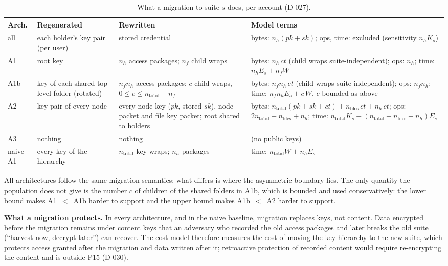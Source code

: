 \documentclass[11pt,a4paper]{article}
\begin{document}
\begin{table}[H]
\centering\small
\caption{What a migration to suite $s$ does, per account (D-027).}\label{tab:accounting}
\begin{tabularx}{\textwidth}{l >{\raggedright\arraybackslash}X >{\raggedright\arraybackslash}X >{\raggedright\arraybackslash}X}
\toprule
\textbf{Arch.} & \textbf{Regenerated} & \textbf{Rewritten} & \textbf{Model terms}\\
\midrule
all & each holder's key pair (per user) & stored credential & bytes: $n_h(pk+sk)$; ops, time: excluded (sensitivity $n_h K_s$)\\
A1 & root key & $n_h$ access packages; $n_f$ child wraps & bytes: $n_h\,ct$ (child wraps suite-independent); ops: $n_h$; time: $n_h E_s + n_f W$\\
A1b & key of each shared top-level folder (rotated) & $n_f n_h$ access packages; $c$ child wraps, $0 \le c \le n_{\mathrm{total}} - n_f$ & bytes: $n_f n_h\,ct$ (child wraps suite-independent); ops: $n_f n_h$; time: $n_f n_h E_s + c\,W$, $c$ bounded as above\\
A2 & key pair of every node & every node key ($pk$, stored $sk$), node packet and file key packet; root shared to holders & bytes: $n_{\mathrm{total}}(pk+sk+ct) + n_{\mathrm{files}}\,ct + n_h\,ct$; ops: $2n_{\mathrm{total}} + n_{\mathrm{files}} + n_h$; time: $n_{\mathrm{total}} K_s + (n_{\mathrm{total}} + n_{\mathrm{files}} + n_h) E_s$\\
A3 & nothing & nothing & 0 (no public keys)\\
naive A1 & every key of the hierarchy & $n_{\mathrm{total}}$ key wraps; $n_h$ packages & time: $n_{\mathrm{total}} W + n_h E_s$\\
\bottomrule
\end{tabularx}
\end{table}
All architectures follow the same migration semantics; what differs is where the asymmetric boundary lies. The only quantity the population does not give is the number $c$ of children of the shared folders in A1b, which is bounded and used conservatively: the lower bound makes A1~$<$~A1b harder to support and the upper bound makes A1b~$<$~A2 harder to support.

\textbf{What a migration protects.} In every architecture, and in the naive baseline, migration replaces keys, not content. Data encrypted before the migration remains under content keys that an adversary who recorded the old access packages and later breaks the old suite (``harvest now, decrypt later'') can recover. The cost model therefore measures the cost of moving the key hierarchy to the new suite, which protects access granted after the migration and data written after it; retroactive protection of recorded content would require re-encrypting the content and is outside P15 (D-030).
\end{document}
